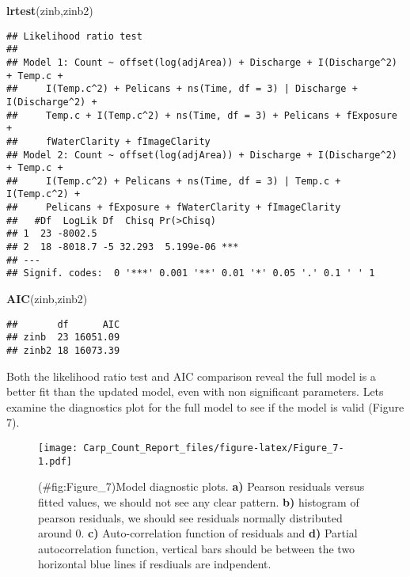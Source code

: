 \documentclass[]{article}
\newenvironment{Shaded}{\begin{snugshade}}{\end{snugshade}}
\newcommand{\KeywordTok}[1]{\textcolor[rgb]{0.13,0.29,0.53}{\textbf{{#1}}}}
\newcommand{\NormalTok}[1]{{#1}}
\begin{document}
\begin{Shaded}
\begin{Highlighting}[]
\KeywordTok{lrtest}\NormalTok{(zinb,zinb2)}
\end{Highlighting}
\end{Shaded}

\begin{verbatim}
## Likelihood ratio test
## 
## Model 1: Count ~ offset(log(adjArea)) + Discharge + I(Discharge^2) + Temp.c + 
##     I(Temp.c^2) + Pelicans + ns(Time, df = 3) | Discharge + I(Discharge^2) + 
##     Temp.c + I(Temp.c^2) + ns(Time, df = 3) + Pelicans + fExposure + 
##     fWaterClarity + fImageClarity
## Model 2: Count ~ offset(log(adjArea)) + Discharge + I(Discharge^2) + Temp.c + 
##     I(Temp.c^2) + Pelicans + ns(Time, df = 3) | Temp.c + I(Temp.c^2) + 
##     Pelicans + fExposure + fWaterClarity + fImageClarity
##   #Df  LogLik Df  Chisq Pr(>Chisq)    
## 1  23 -8002.5                         
## 2  18 -8018.7 -5 32.293  5.199e-06 ***
## ---
## Signif. codes:  0 '***' 0.001 '**' 0.01 '*' 0.05 '.' 0.1 ' ' 1
\end{verbatim}

\begin{Shaded}
\begin{Highlighting}[]
\KeywordTok{AIC}\NormalTok{(zinb,zinb2)}
\end{Highlighting}
\end{Shaded}

\begin{verbatim}
##       df      AIC
## zinb  23 16051.09
## zinb2 18 16073.39
\end{verbatim}

Both the likelihood ratio test and AIC comparison reveal the full model
is a better fit than the updated model, even with non significant
parameters. Lets examine the diagnostics plot for the full model to see
if the model is valid (Figure 7).

\begin{figure}[htbp]
\centering
\texttt{[image: Carp\_Count\_Report\_files/figure-latex/Figure\_7-1.pdf]}
\caption{(\#fig:Figure\_7)Model diagnostic plots. \textbf{a)} Pearson
residuals versus fitted values, we should not see any clear pattern.
\textbf{b)} histogram of pearson residuals, we should see residuals
normally distributed around 0. \textbf{c)} Auto-correlation function of
residuals and \textbf{d)} Partial autocorrelation function, vertical
bars should be between the two horizontal blue lines if resdiuals are
indpendent.}
\end{figure}
\end{document}
